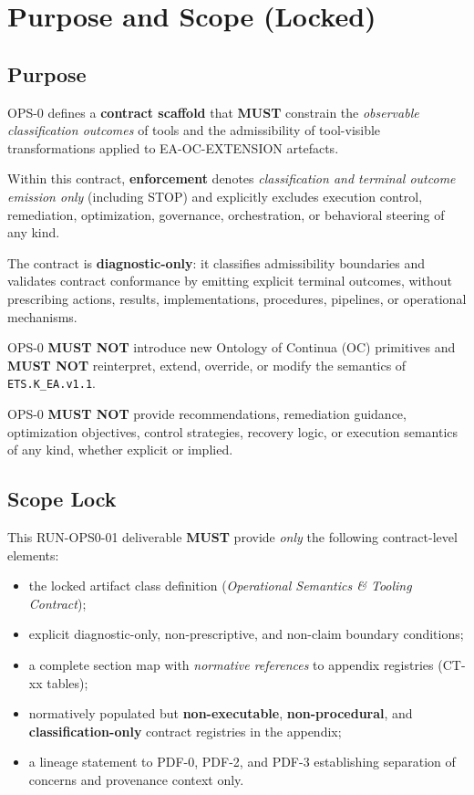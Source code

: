﻿\section{Purpose and Scope (Locked)}

\subsection{Purpose}
OPS-0 defines a \textbf{contract scaffold} that \textbf{MUST} constrain the
\emph{observable classification outcomes} of tools and the admissibility of
tool-visible transformations applied to EA-OC-EXTENSION artefacts.

Within this contract, \textbf{enforcement} denotes \emph{classification and
terminal outcome emission only} (including STOP) and explicitly excludes
execution control, remediation, optimization, governance, orchestration,
or behavioral steering of any kind.

The contract is \textbf{diagnostic-only}: it classifies admissibility boundaries
and validates contract conformance by emitting explicit terminal outcomes,
without prescribing actions, results, implementations, procedures,
pipelines, or operational mechanisms.

OPS-0 \textbf{MUST NOT} introduce new Ontology of Continua (OC) primitives and
\textbf{MUST NOT} reinterpret, extend, override, or modify the semantics of
\texttt{ETS.K\_EA.v1.1}.

OPS-0 \textbf{MUST NOT} provide recommendations, remediation guidance,
optimization objectives, control strategies, recovery logic,
or execution semantics of any kind, whether explicit or implied.

\subsection{Scope Lock}
This RUN-OPS0-01 deliverable \textbf{MUST} provide \emph{only} the following
contract-level elements:

\begin{itemize}
  \item the locked artifact class definition
        (\emph{Operational Semantics \& Tooling Contract});
  \item explicit diagnostic-only, non-prescriptive,
        and non-claim boundary conditions;
  \item a complete section map with \emph{normative references}
        to appendix registries (CT-xx tables);
  \item normatively populated but \textbf{non-executable},
        \textbf{non-procedural}, and \textbf{classification-only}
        contract registries in the appendix;
  \item a lineage statement to PDF-0, PDF-2, and PDF-3
        establishing separation of concerns
        and provenance context only.
\end{itemize}


